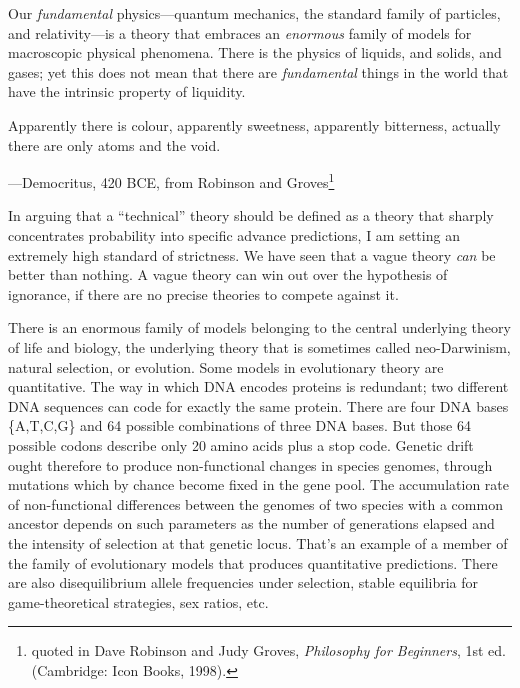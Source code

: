 {
 Our \textit{fundamental} physics---quantum mechanics, the standard
family of particles, and relativity---is a theory that embraces an
\textit{enormous} family of models for macroscopic physical phenomena.
There is the physics of liquids, and solids, and gases; yet this does
not mean that there are \textit{fundamental} things in the world that
have the intrinsic property of liquidity.}

{
 Apparently there is colour, apparently sweetness, apparently
bitterness, actually there are only atoms and the void.}

{\raggedleft
 {}---Democritus, 420 BCE, from Robinson and
Groves\footnote{quoted in Dave Robinson and Judy Groves, \textit{Philosophy
for Beginners}, 1st ed. (Cambridge: Icon Books, 1998).}
\par}


\bigskip

{
 In arguing that a ``technical''
theory should be defined as a theory that sharply concentrates
probability into specific advance predictions, I am setting an
extremely high standard of strictness. We have seen that a vague theory
\textit{can} be better than nothing. A vague theory can win out over
the hypothesis of ignorance, if there are no precise theories to
compete against it.}

{
 There is an enormous family of models belonging to the central
underlying theory of life and biology, the underlying theory that is
sometimes called neo-Darwinism, natural selection, or evolution. Some
models in evolutionary theory are quantitative. The way in which DNA
encodes proteins is redundant; two different DNA sequences can code for
exactly the same protein. There are four DNA bases
\{A,T,C,G\}
and 64 possible combinations of three DNA bases. But those 64 possible
codons describe only 20 amino acids plus a stop code. Genetic drift
ought therefore to produce non-functional changes in species genomes,
through mutations which by chance become fixed in the gene pool. The
accumulation rate of non-functional differences between the genomes of
two species with a common ancestor depends on such parameters as the
number of generations elapsed and the intensity of selection at that
genetic locus. That's an example of a member of the
family of evolutionary models that produces quantitative predictions.
There are also disequilibrium allele frequencies under selection,
stable equilibria for game-theoretical strategies, sex ratios, etc.}

